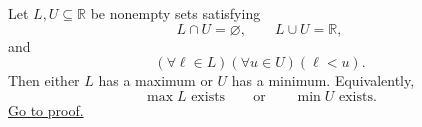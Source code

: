 \begin{theorem}
\label{thm:dedekind-cut-property}
Let $L,U\subseteq\mathbb{R}$ be nonempty sets satisfying
\[
  L\cap U=\varnothing,
  \qquad
  L\cup U=\mathbb{R},
\]
and
\[
  (\forall \ell\in L)(\forall u\in U)(\ell<u).
\]
Then either $L$ has a maximum or $U$ has a minimum.  Equivalently,
\[
  \max L\text{ exists}
  \qquad\text{or}\qquad
  \min U\text{ exists}.
\]
\hyperref[prf:dedekind-cut-property]{Go to proof.}
\end{theorem}